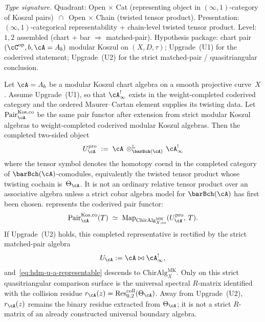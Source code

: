 \begin{theorem}
\label{thm:hdm-u-a-universal-property}
\emph{Type signature.} Quadrant: Open $\times$ Cat
(representing object in $(\infty,1)$-category of Koszul pairs)
$\,\cap\,$ Open $\times$ Chain (twisted tensor product). Presentation:
$(\infty,1)$-categorical representability + chain-level
twisted tensor product. Level: $1, 2$ assembled (chart + bar
$\Rightarrow$ matched-pair). Hypothesis package: chart pair
$(\cC^{\mathrm{op}}, b, \cA = A_b)$ modular Koszul on $(X, D, \tau)$;
Upgrade~\textup{(U1)} for the coderived statement; Upgrade~\textup{(U2)}
for the strict matched-pair / quasitriangular conclusion.

Let $\cA = A_b$ be a modular Koszul chart algebra on a smooth
projective curve~$X$. Assume Upgrade~\textup{(U1)}, so that
$\cA^{!}_\infty$ exists in the weight-completed coderived category and
the ordered Maurer--Cartan element supplies its twisting data. Let
$\mathrm{Pair}^{\mathrm{Kos,co}}_\cA$ be the same pair functor after
extension from strict modular Koszul algebras to weight-completed
coderived modular Koszul algebras. Then the completed two-sided object
\begin{equation}\label{eq:hdm-u-a-relative-tensor}
U_\cA^{\mathrm{pro}}
\;:=\;
\cA \,\otimes^{\mathbb L}_{\barBch(\cA)}\, \cA^{!}_\infty
\end{equation}
where the tensor symbol denotes the homotopy coend in the completed
category of $\barBch(\cA)$-comodules, equivalently the twisted tensor
product whose twisting cochain is~$\Theta_\cA$. It is not an ordinary
relative tensor product over an associative algebra unless a strict
cobar algebra model for $\barBch(\cA)$ has first been chosen.
represents the coderived pair functor:
\begin{equation}\label{eq:hdm-u-a-representable}
\mathrm{Pair}^{\mathrm{Kos,co}}_\cA(T)
\;\simeq\;
\mathrm{Map}_{\mathrm{ChirAlg}^{\mathrm{MK}}_{X,\mathrm{co}}}
(U_\cA^{\mathrm{pro}},\,T).
\end{equation}
If Upgrade~\textup{(U2)} holds, this completed representative is
rectified by the strict matched-pair algebra
\[
  U_\cA := \cA \bowtie \cA^{!}_\infty,
\]
and~\eqref{eq:hdm-u-a-representable} descends to
$\mathrm{ChirAlg}^{\mathrm{MK}}_X$. Only on this strict
quasitriangular comparison surface is the universal spectral
$R$-matrix identified with the collision residue
$r_\cA(z) = \mathrm{Res}^{\mathrm{coll}}_{0,2}(\Theta_\cA)$. Away from
Upgrade~\textup{(U2)}, $r_\cA(z)$ remains the binary residue extracted
from $\Theta_\cA$; it is not a strict $R$-matrix of an already
constructed universal boundary algebra.
\end{theorem}

